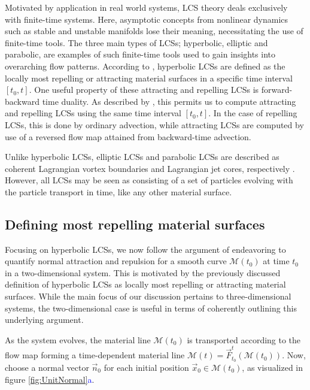Motivated by application in real world systems, LCS theory deals exclusively with finite-time systems. Here, asymptotic concepts from nonlinear dynamics such as stable and unstable manifolds lose their meaning, necessitating the use of finite-time tools. The three main types of LCSs; hyperbolic, elliptic and parabolic, are examples of such finite-time tools used to gain insights into overarching flow patterns. According to \cite{LCStool}, hyperbolic LCSs are defined as the locally most repelling or attracting material surfaces in a specific time interval $[t_0,t]$. One useful property of these attracting and repelling LCSs is forward-backward time duality. As described by \cite{LCSreview}, this permits us to compute attracting and repelling LCSs using the same time interval $[t_0,t]$. In the case of repelling LCSs, this is done by ordinary advection, while attracting LCSs are computed by use of a reversed flow map attained from backward-time advection.

Unlike hyperbolic LCSs, elliptic LCSs and parabolic LCSs are described as coherent Lagrangian vortex boundaries and Lagrangian jet cores, respectively \citep{LCStool}. However, all LCSs may be seen as consisting of a set of particles evolving with the particle transport in time, like any other material surface.

\subsection{Defining most repelling material surfaces}\label{sec:MostRepelling}

Focusing on hyperbolic LCSs, we now follow the argument of \cite{Haller12} endeavoring to quantify normal attraction and repulsion for a smooth curve $\mathcal{M}(t_0)$ at time $t_0$ in a two-dimensional system. This is motivated by the previously discussed definition of hyperbolic LCSs as locally most repelling or attracting material surfaces. While the main focus of our discussion pertains to three-dimensional systems, the two-dimensional case is useful in terms of coherently outlining this underlying argument. 

As the system evolves, the material line $\mathcal{M}(t_0)$ is transported according to the flow map forming a time-dependent material line $\mathcal{M}(t) = \vec{F}_{t_0}^t(\mathcal{M}(t_0))$. Now, choose a normal vector $\vec{n}_0$ for each initial position $\vec{x}_0 \in \mathcal{M}(t_0)$, as visualized in figure \ref{fig:UnitNormal}\textcolor{blue}{a}.

